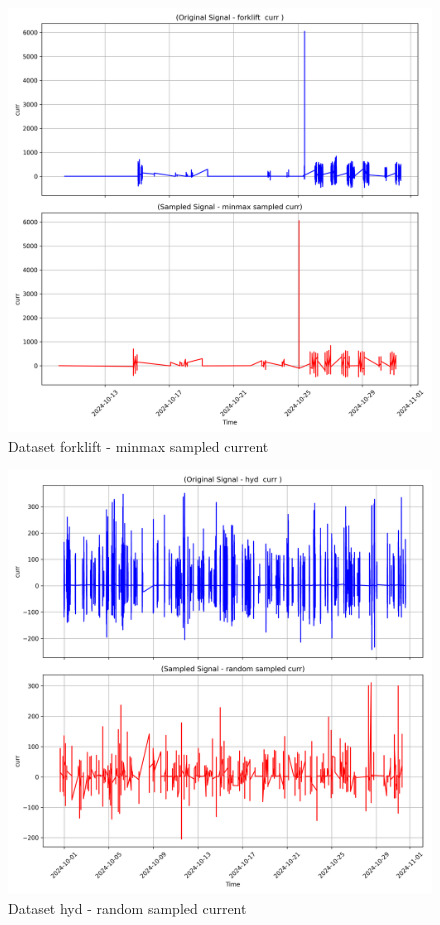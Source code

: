 \begin{figure}
    \centering
    \includegraphics[width=1\linewidth]{screenshots/forklift/minmax_sampled_curr_screenshot.png}
    \caption{Dataset forklift - minmax sampled current }
    \label{fig:forklift_minmax_sampled_curr_screenshot}
\end{figure}
\begin{figure}
    \centering
    \includegraphics[width=1\linewidth]{screenshots/hyd/random_sampled_curr_screenshot.png}
    \caption{Dataset hyd - random sampled current }
    \label{fig:hyd_random_sampled_curr_screenshot}
\end{figure}
